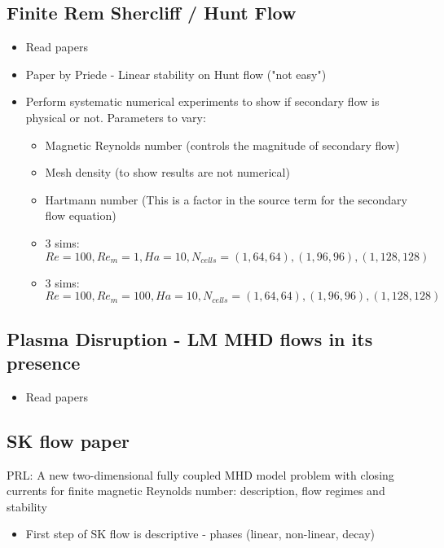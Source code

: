 \documentclass[11pt]{article}
\begin{document}
\subsection{Finite Rem Shercliff / Hunt Flow}
\begin{itemize}
\setlength\itemsep{-1em}
\item Read papers
\item Paper by Priede - Linear stability on Hunt flow ("not easy")
\item Perform systematic numerical experiments to show if secondary flow is physical or not. Parameters to vary:
\begin{itemize}
\setlength\itemsep{-1em}
\item Magnetic Reynolds number (controls the magnitude of secondary flow)
\item Mesh density (to show results are not numerical)
\item Hartmann number (This is a factor in the source term for the secondary flow equation)
\end{itemize}
\begin{itemize}
\setlength\itemsep{-1em}
\item 3 sims: $Re = 100, Re_m = 1, Ha = 10, N_{cells} = (1,64,64), (1,96,96), (1,128,128)$
\item 3 sims: $Re = 100, Re_m = 100, Ha = 10, N_{cells} = (1,64,64), (1,96,96), (1,128,128)$
\end{itemize}
\end{itemize}

\subsection{Plasma Disruption - LM MHD flows in its presence}
\begin{itemize}
\setlength\itemsep{-1em}
\item Read papers
\end{itemize}

\subsection{SK flow paper}
PRL: A new two-dimensional fully coupled MHD model problem with closing currents for finite magnetic Reynolds number: description, flow regimes and stability
\begin{itemize}
\setlength\itemsep{-1em}
\item First step of SK flow is descriptive - phases (linear, non-linear, decay)
\end{itemize}
\end{document}
